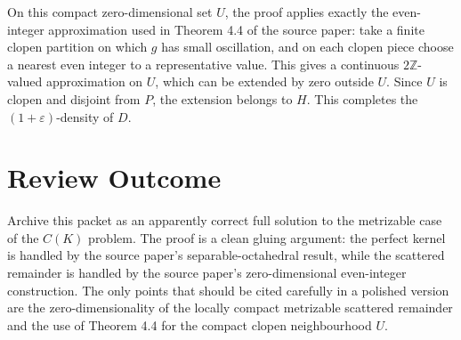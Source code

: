 ﻿\documentclass[11pt]{article}
\newcommand{\Z}{\mathbb Z}
\begin{document}
On this compact zero-dimensional set \(U\), the proof applies exactly the even-integer approximation used in Theorem 4.4 of the source paper: take a finite clopen partition on which \(g\) has small oscillation, and on each clopen piece choose a nearest even integer to a representative value. This gives a continuous \(2\Z\)-valued approximation on \(U\), which can be extended by zero outside \(U\). Since \(U\) is clopen and disjoint from \(P\), the extension belongs to \(H\). This completes the \((1+\varepsilon)\)-density of \(D\).

\section*{Review Outcome}

Archive this packet as an apparently correct full solution to the metrizable case of the \(C(K)\) problem. The proof is a clean gluing argument: the perfect kernel is handled by the source paper's separable-octahedral result, while the scattered remainder is handled by the source paper's zero-dimensional even-integer construction. The only points that should be cited carefully in a polished version are the zero-dimensionality of the locally compact metrizable scattered remainder and the use of Theorem 4.4 for the compact clopen neighbourhood \(U\).
\end{document}
